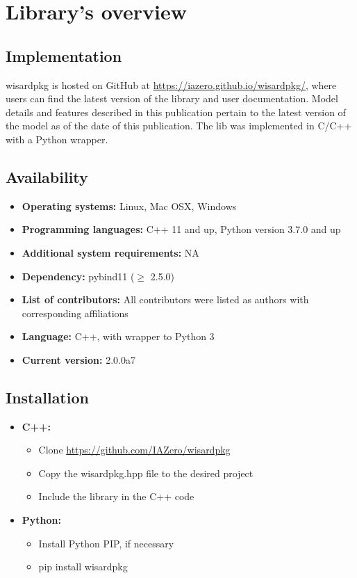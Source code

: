 \documentclass[12pt]{article}
\begin{document}
\section{Library's overview}

\subsection{Implementation}

wisardpkg is hosted on GitHub at \hyperlink{https://iazero.github.io/wisardpkg/}{https://iazero.github.io/wisardpkg/}, where users can find the latest version of the library and user documentation. Model details and features described in this publication pertain to the latest version of the model as of the date of this publication. The lib was implemented in C/C++ with a Python wrapper.

\subsection{Availability}

\begin{itemize}
    \item \textbf{Operating systems:} Linux, Mac OSX, Windows
    \item \textbf{Programming languages:} C++ 11 and up, Python version 3.7.0 and up
    \item \textbf{Additional system requirements:} NA
    \item \textbf{Dependency:} pybind11 ($\geq$ 2.5.0)
    \item \textbf{List of contributors:} All contributors were listed as authors with corresponding affiliations
    \item \textbf{Language:} C++, with wrapper to Python 3
    \item \textbf{Current version:} 2.0.0a7
    
\end{itemize}

\subsection{Installation}

\begin{itemize}
    \item \textbf{C++:}
        \begin{itemize}
            \item Clone \hyperlink{https://github.com/IAZero/wisardpkg}{https://github.com/IAZero/wisardpkg}
            \item Copy the wisardpkg.hpp file to the desired project
            \item Include the library in the C++ code
        \end{itemize}
    \item \textbf{Python:}
    \begin{itemize}
        \item Install Python PIP, if necessary
        \item pip install wisardpkg 
    \end{itemize}
\end{itemize}
\end{document}

